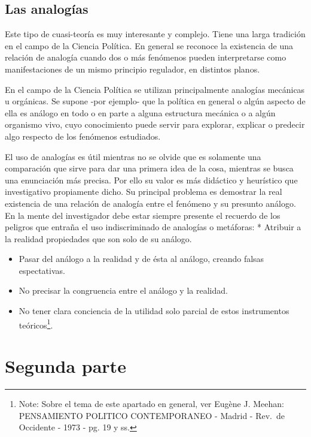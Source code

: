 \documentclass[
]{book}
\begin{document}
\hypertarget{las-analoguxedas}{%
\subsection*{Las analogías}\label{las-analoguxedas}}

Este tipo de cuasi-teoría es muy interesante y complejo. Tiene una larga tradición en el campo de la Ciencia Política. En general se reconoce la existencia de una relación de analogía cuando dos o más fenómenos pueden interpretarse como manifestaciones de un mismo principio regulador, en distintos planos.

En el campo de la Ciencia Política se utilizan principalmente analogías mecánicas u orgánicas. Se supone -por ejemplo- que la política en general o algún aspecto de ella es análogo en todo o en parte a alguna estructura mecánica o a algún organismo vivo, cuyo conocimiento puede servir para explorar, explicar o predecir algo respecto de los fenómenos estudiados.

El uso de analogías es útil mientras no se olvide que es solamente una comparación que sirve para dar una primera idea de la cosa, mientras se busca una enunciación más precisa. Por ello su valor es más didáctico y heurístico que investigativo propiamente dicho. Su principal problema es demostrar la real existencia de una relación de analogía entre el fenómeno y su presunto análogo. En la mente del investigador debe estar siempre presente el recuerdo de los peligros que entraña el uso indiscriminado de analogías o metáforas: * Atribuir a la realidad propiedades que son solo de su análogo.

\begin{itemize}
\item
  Pasar del análogo a la realidad y de ésta al análogo, creando falsas espectativas.
\item
  No precisar la congruencia entre el análogo y la realidad.
\item
  No tener clara conciencia de la utilidad solo parcial de estos instrumentos teóricos\footnote{Note: Sobre el tema de este apartado en general, ver Eugène J. Meehan: PENSAMIENTO POLITICO CONTEMPORANEO - Madrid - Rev.~de Occidente - 1973 - pg. 19 y ss.}.
\end{itemize}

\hypertarget{segunda-parte}{%
\section*{Segunda parte}\label{segunda-parte}}
\end{document}
